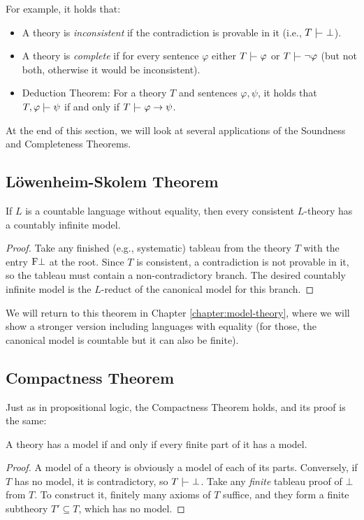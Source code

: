 For example, it holds that:
\begin{itemize}
    \item A theory is \emph{inconsistent} if the contradiction is provable in it (i.e., $T\proves\bot$).
    \item A theory is \emph{complete} if for every sentence $\varphi$ either $T\proves\varphi$ or $T\proves\neg\varphi$ (but not both, otherwise it would be inconsistent).
    \item Deduction Theorem: For a theory $T$ and sentences $\varphi,\psi$, it holds that $T,\varphi\proves\psi$ if and only if $T\proves\varphi\to\psi$.
\end{itemize}

At the end of this section, we will look at several applications of the Soundness and Completeness Theorems.

\subsection{Löwenheim-Skolem Theorem}\label{subsection:loewenheim-skolem-theorem}

\begin{theorem}
    If $L$ is a countable language without equality, then every consistent $L$-theory has a countably infinite model.
\end{theorem}

\begin{proof}
Take any finished (e.g., systematic) tableau from the theory $T$ with the entry $\mathrm{F}\bot$ at the root. Since $T$ is consistent, a contradiction is not provable in it, so the tableau must contain a non-contradictory branch. The desired countably infinite model is the $L$-reduct of the canonical model for this branch.
\end{proof}

We will return to this theorem in Chapter \ref{chapter:model-theory}, where we will show a stronger version including languages with equality (for those, the canonical model is countable but it can also be finite).

\subsection{Compactness Theorem}

Just as in propositional logic, the Compactness Theorem holds, and its proof is the same:

\begin{theorem}[On Compactness]\label{theorem:compactness-theorem-predicate}
    A theory has a model if and only if every finite part of it has a model.    
\end{theorem}
\begin{proof}
A model of a theory is obviously a model of each of its parts. Conversely, if $T$ has no model, it is contradictory, so $T\proves\bot$. Take any \emph{finite} tableau proof of $\bot$ from $T$. To construct it, finitely many axioms of $T$ suffice, and they form a finite subtheory $T'\subseteq T$, which has no model.
\end{proof}


